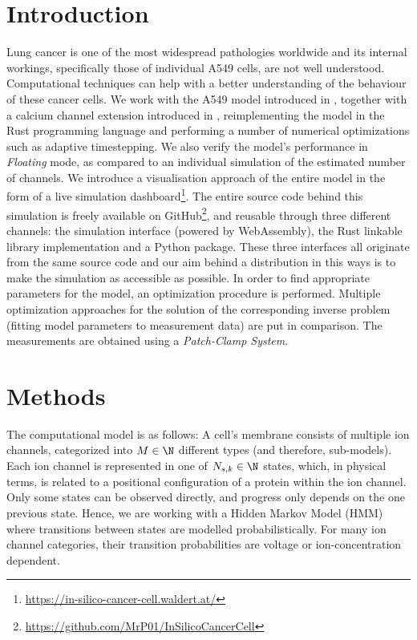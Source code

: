 \documentclass[USenglish,twocolumn]{article}
\begin{document}
  \section{Introduction}
  Lung cancer is one of the most widespread pathologies worldwide and its internal workings, specifically those of individual A549 cells, are not well understood.
  Computational techniques can help with a better understanding of the behaviour of these cancer cells.
  We work with the A549 model introduced in \cite{2021-A549-model}, together with a calcium channel extension introduced in \cite{2024-calcium-channels}, reimplementing the model in the Rust programming language and performing a number of numerical optimizations such as adaptive timestepping.
  We also verify the model's performance in \textit{Floating} mode, as compared to an individual simulation of the estimated number of channels.
  We introduce a visualisation approach of the entire model in the form of a live simulation dashboard\footnote{\url{https://in-silico-cancer-cell.waldert.at/}}.
  The entire source code behind this simulation is freely available on GitHub\footnote{\url{https://github.com/MrP01/InSilicoCancerCell}}, and reusable through three different channels: the simulation interface (powered by WebAssembly), the Rust linkable library implementation and a Python package.
  These three interfaces all originate from the same source code and our aim behind a distribution in this ways is to make the simulation as accessible as possible.
  In order to find appropriate parameters for the model, an optimization procedure is performed.
  Multiple optimization approaches for the solution of the corresponding inverse problem (fitting model parameters to measurement data) are put in comparison.
  The measurements are obtained using a \textit{Patch-Clamp System}.

  \section{Methods}
  The computational model is as follows:
  A cell's membrane consists of multiple ion channels, categorized into $M \in \N$ different types (and therefore, sub-models).
  Each ion channel is represented in one of $N_{s, k} \in \N$ states, which, in physical terms, is related to a positional configuration of a protein within the ion channel.
  Only some states can be observed directly, and progress only depends on the one previous state.
  Hence, we are working with a Hidden Markov Model (HMM) where transitions between states are modelled probabilistically.
  For many ion channel categories, their transition probabilities are voltage or ion-concentration dependent.
\end{document}
